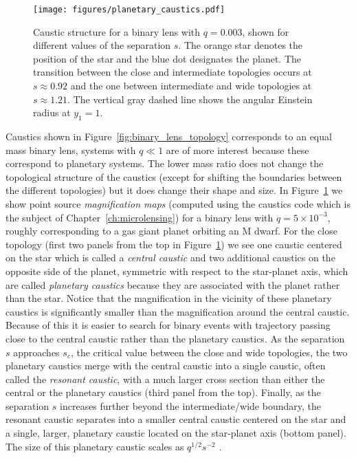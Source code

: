 \documentclass[12pt]{report}
\begin{document}
\begin{figure}[t]
    \centering
    \texttt{[image: figures/planetary\_caustics.pdf]}
    \caption{Caustic structure for a binary lens with $q=0.003$, shown for different
        values of the separation $s$. The orange star denotes the position of the star and
        the blue dot designates the planet.
        The transition between the close and intermediate
        topologies occurs at $s\approx 0.92$ and the one between intermediate and wide
        topologies at $s\approx 1.21$. The vertical gray dashed line shows the angular
        Einstein radius at $y_1=1$. }
    \label{fig:planetary_caustics}
\end{figure}

Caustics shown in Figure~\ref{fig:binary_lens_topology} corresponds to an equal
mass binary lens, systems with $q\ll 1$ are of more interest because these
correspond to planetary systems. The lower mass ratio does not change the
topological structure of the caustics (except for shifting the boundaries
between the different topologies) but it does change their shape and size. In
Figure~\ref{fig:planetary_caustics} we show point source \emph{magnification
    maps} (computed using the \textsf{caustics} code which is the subject of
Chapter~\ref{ch:microlensing}) for a binary lens with $q=5\times 10^{-3}$,
roughly corresponding to a gas giant planet orbiting an M dwarf. For the close
topology (first two panels from the top in Figure~\ref{fig:planetary_caustics})
we see one caustic centered on the star which is called a \emph{central
    caustic} and two additional caustics on the opposite side of the planet,
symmetric with respect to the star-planet axis, which are called
\emph{planetary caustics} because they are associated with the planet rather
than the star. Notice that the magnification in the vicinity of these planetary
caustics is significantly smaller than the magnification around the central
caustic. Because of this it is easier to search for binary events with
trajectory passing close to the central caustic rather than the planetary
caustics. As the separation $s$ approaches $s_c$, the critical value between
the close and wide topologies, the two planetary caustics merge with the
central caustic into a single caustic, often called the \emph{resonant
    caustic}, with a much larger cross section than either the central or the
planetary caustics (third panel from the top). Finally, as the separation $s$
increases further beyond the intermediate/wide boundary, the resonant caustic
separates into a smaller central caustic centered on the star and a single,
larger, planetary caustic located on the star-planet axis (bottom panel). The
size of this planetary caustic scales as $q^{1/2}s^{-2}$ \citep[see references
    in review by][]{Gaudi2012}.
\end{document}

